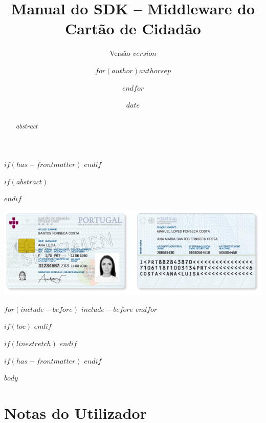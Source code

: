 \documentclass[
  $if(fontsize)$
    $fontsize$,
  $endif$
  $if(lang)$
    $babel-lang$,
  $endif$
  $if(papersize)$
    $papersize$paper,
  $endif$
  $for(classoption)$
    $classoption$$sep$,
  $endfor$]{article}
\title{\Huge Manual do SDK – Middleware do\\Cartão de Cidadão}
\subtitle{\Large Versão $version$}
\author{$for(author)$$author$$sep$ \and $endfor$}
\date{$date$}
\let\latexincludegraphics\includegraphics
\renewcommand{\includegraphics}[2][]{%
\begin{center}\latexincludegraphics[#1]{#2}\end{center}}
\let\OldRule\rule
\renewcommand{\rule}[2]{\OldRule{\linewidth}{#2}}
\begin{document}
$if(has-frontmatter)$
  \frontmatter
$endif$

\clearpage\maketitle
\thispagestyle{empty}

$if(abstract)$
  \begin{abstract}
    $abstract$
  \end{abstract}
$endif$

\includegraphics[width=\textwidth]{Pictures/CartaoCidadao.png}

\newpage
$for(include-before)$
  $include-before$
$endfor$

$if(toc)$
  \renewcommand*\contentsname{Tabela de Conteúdos}
  \setcounter{tocdepth}{3}
  \clearpage\tableofcontents
  \thispagestyle{empty}
$endif$

$if(linestretch)$
$endif$

$if(has-frontmatter)$
  \mainmatter
$endif$

\let\stdsection\section
\renewcommand\section{\newpage\stdsection}

$body$

\newpage

\section{Notas do Utilizador}

\newcommand{\myRule}[3][gray]{\textcolor{#1}{\rule{#2}{#3}}}

\setlength{\parskip}{0.5cm}
\end{document}
